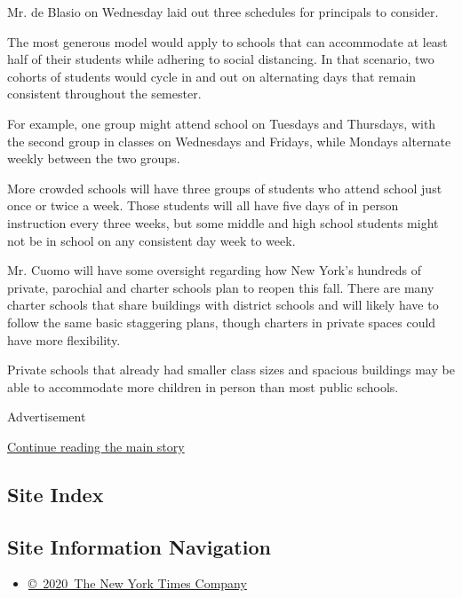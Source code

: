 Mr. de Blasio on Wednesday laid out three schedules for principals to
consider.

The most generous model would apply to schools that can accommodate at
least half of their students while adhering to social distancing. In
that scenario, two cohorts of students would cycle in and out on
alternating days that remain consistent throughout the semester.

For example, one group might attend school on Tuesdays and Thursdays,
with the second group in classes on Wednesdays and Fridays, while
Mondays alternate weekly between the two groups.

More crowded schools will have three groups of students who attend
school just once or twice a week. Those students will all have five days
of in person instruction every three weeks, but some middle and high
school students might not be in school on any consistent day week to
week.

Mr. Cuomo will have some oversight regarding how New York's hundreds of
private, parochial and charter schools plan to reopen this fall. There
are many charter schools that share buildings with district schools and
will likely have to follow the same basic staggering plans, though
charters in private spaces could have more flexibility.

Private schools that already had smaller class sizes and spacious
buildings may be able to accommodate more children in person than most
public schools.

Advertisement

\protect\hyperlink{after-bottom}{Continue reading the main story}

\hypertarget{site-index}{%
\subsection{Site Index}\label{site-index}}

\hypertarget{site-information-navigation}{%
\subsection{Site Information
Navigation}\label{site-information-navigation}}

\begin{itemize}
\tightlist
\item
  \href{https://help.nytimes3xbfgragh.onion/hc/en-us/articles/115014792127-Copyright-notice}{©~2020~The
  New York Times Company}
\end{itemize}

